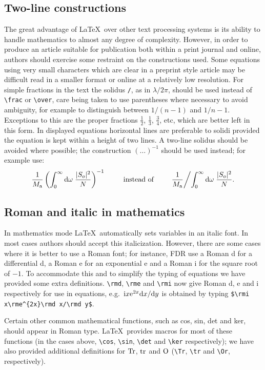 \documentclass[12pt]{iopart}
\begin{document}
\subsection{Two-line constructions}
The great advantage of \LaTeX\ 
over other text processing systems is its 
ability to handle mathematics to almost any degree of complexity. However, 
in order to produce an article suitable for publication both within a print journal and online, 
authors should exercise some restraint on the constructions used. Some equations using very small characters which are clear in a preprint style article may be difficult read in a smaller format or online at a relatively low resolution.
For simple fractions in the text the solidus \verb"/", as in 
$\lambda/2\pi$, should be used instead of \verb"\frac" or \verb"\over", 
care being taken to use parentheses where necessary to avoid ambiguity, 
for example to distinguish between $1/(n-1)$ and $1/n-1$. Exceptions to 
this are the proper fractions $\frac12$, $\frac13$, $\frac34$, 
etc, which are better left in this form. In displayed equations 
horizontal lines are preferable to solidi provided the equation is 
kept within a height of two lines. A two-line solidus should be 
avoided where possible; the construction $(\ldots)^{-1}$ should be 
used instead; for example use:
\begin{equation*}
\frac{1}{M_{\rm a}}\left(\int^\infty_0{\rm d}
\omega\;\frac{|S_o|^2}{N}\right)^{-1}\qquad\mbox{instead of}\qquad
\frac{1}{M_{\rm a}}\biggl/\int^\infty_0{\rm d}
\omega\;\frac{|S_o|^2}{N}.
\end{equation*}

\subsection{Roman and italic in mathematics}
In mathematics mode \LaTeX\ automatically sets variables in an italic 
font. In most cases authors should accept this italicization. However, 
there are some cases where it is better to use a Roman font; for 
instance, FDR use a Roman d for a differential d, a Roman e 
for an exponential e and a Roman i for the square root of $-1$. To 
accommodate this and to simplify the  typing of equations we have 
provided some extra definitions. \verb"\rmd", \verb"\rme" and \verb"\rmi" 
now give Roman d, e and i respectively for use in equations, 
e.g.\ $\rmi x\rme^{2x}\rmd x/\rmd y$ 
is obtained by typing \verb"$\rmi x\rme^{2x}\rmd x/\rmd y$". 
 

Certain other common mathematical functions, such as cos, sin, det and 
ker, should appear in Roman type. \LaTeX\ provides macros for 
most of these functions 
(in the cases above, \verb"\cos", \verb"\sin", \verb"\det" and \verb"\ker" 
respectively); we have also provided 
additional definitions for $\Tr$, $\tr$ and 
$\Or$ (\verb"\Tr", \verb"\tr" and \verb"\Or", respectively). 
\end{document}
